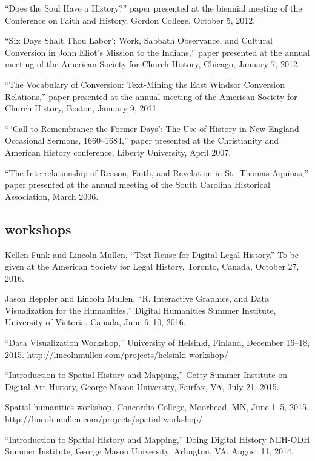 \documentclass[11pt]{article}
\begin{document}
``Does the Soul Have a History?'' paper presented at the biennial
meeting of the Conference on Faith and History, Gordon College, October
5, 2012.

``Six Days Shalt Thou Labor': Work, Sabbath Observance, and Cultural
Conversion in John Eliot's Mission to the Indians,'' paper presented at
the annual meeting of the American Society for Church History, Chicago,
January 7, 2012.

``The Vocabulary of Conversion: Text-Mining the East Windsor Conversion
Relations,'' paper presented at the annual meeting of the American
Society for Church History, Boston, January 9, 2011.

``\,`Call to Remembrance the Former Days': The Use of History in New
England Occasional Sermons, 1660--1684,'' paper presented at the
Christianity and American History conference, Liberty University, April
2007.

``The Interrelationship of Reason, Faith, and Revelation in St.~Thomas
Aquinas,'' paper presented at the annual meeting of the South Carolina
Historical Association, March 2006.

\subsection{workshops}\label{workshops}

Kellen Funk and Lincoln Mullen, ``Text Reuse for Digital Legal History.'' To be given at the American Society for Legal History, Toronto, Canada, October 27, 2016.

Jason Heppler and Lincoln Mullen, ``R, Interactive Graphics, and Data 
Visualization for the Humanities,'' Digital Humanities Summer Institute, 
University of Victoria, Canada, June 6--10, 2016.  

``Data Visualization Workshop,'' University of Helsinki, Finland, December 16--18, 
2015. \url{http://lincolnmullen.com/projects/helsinki-workshop/}

``Introduction to Spatial History and Mapping,'' Getty Summer Institute on 
Digital Art History, George Mason University, Fairfax, VA, July 21, 2015.

Spatial humanities workshop, Concordia College, Moorhead, MN, June 1--5, 2015.  
\url{http://lincolnmullen.com/projects/spatial-workshop/}

``Introduction to Spatial History and Mapping,'' Doing Digital History NEH-ODH 
Summer Institute, George Mason University, Arlington, VA, August 11, 2014.
\end{document}
